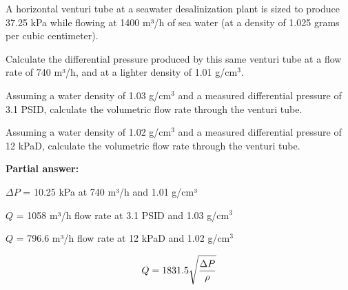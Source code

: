 
A horizontal venturi tube at a seawater desalinization plant is sized to produce 37.25 kPa while flowing at 1400 m³/h of sea water (at a density of 1.025 grams per cubic centimeter).

\vskip 10pt

Calculate the differential pressure produced by this same venturi tube at a flow rate of 740 m³/h, and at a lighter density of 1.01 g/cm$^{3}$.

\vskip 10pt

Assuming a water density of 1.03 g/cm$^{3}$ and a measured differential pressure of 3.1 PSID, calculate the volumetric flow rate through the venturi tube.

\vskip 10pt

Assuming a water density of 1.02 g/cm$^{3}$ and a measured differential pressure of 12 kPaD, calculate the volumetric flow rate through the venturi tube.

%







\noindent
{\bf Partial answer:}

\vskip 10pt

$\Delta P$ = 10.25 kPa at 740 m³/h and 1.01 g/cm³

\vskip 10pt
$Q$ = 1058 m³/h flow rate at 3.1 PSID and 1.03 g/cm$^{3}$

\vskip 10pt

$Q$ = 796.6 m³/h flow rate at 12 kPaD and 1.02 g/cm$^{3}$







$$Q = 1831.5 \sqrt{\Delta P \over \rho}$$

\vskip 10pt

